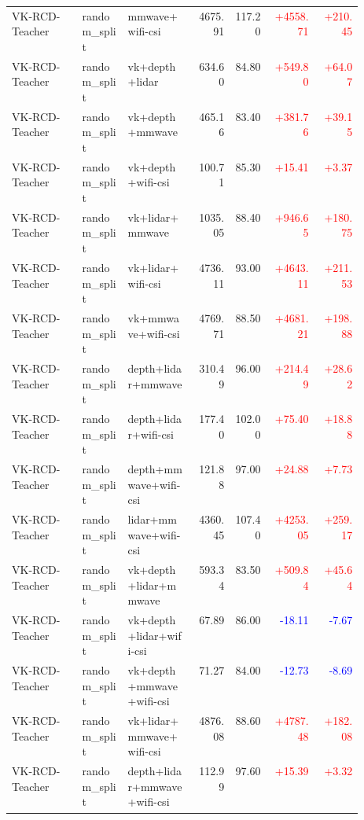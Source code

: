 \begin{longtable}{p{0.20\linewidth}p{0.13\linewidth}p{0.19\linewidth}rrrr}
VK-RCD-Teacher & random\_split & mmwave+wifi-csi & 4675.91 & 117.20 & \textcolor{red}{+4558.71} & \textcolor{red}{+210.45}\\
VK-RCD-Teacher & random\_split & vk+depth+lidar & 634.60 & 84.80 & \textcolor{red}{+549.80} & \textcolor{red}{+64.07}\\
VK-RCD-Teacher & random\_split & vk+depth+mmwave & 465.16 & 83.40 & \textcolor{red}{+381.76} & \textcolor{red}{+39.15}\\
VK-RCD-Teacher & random\_split & vk+depth+wifi-csi & 100.71 & 85.30 & \textcolor{red}{+15.41} & \textcolor{red}{+3.37}\\
VK-RCD-Teacher & random\_split & vk+lidar+mmwave & 1035.05 & 88.40 & \textcolor{red}{+946.65} & \textcolor{red}{+180.75}\\
VK-RCD-Teacher & random\_split & vk+lidar+wifi-csi & 4736.11 & 93.00 & \textcolor{red}{+4643.11} & \textcolor{red}{+211.53}\\
VK-RCD-Teacher & random\_split & vk+mmwave+wifi-csi & 4769.71 & 88.50 & \textcolor{red}{+4681.21} & \textcolor{red}{+198.88}\\
VK-RCD-Teacher & random\_split & depth+lidar+mmwave & 310.49 & 96.00 & \textcolor{red}{+214.49} & \textcolor{red}{+28.62}\\
VK-RCD-Teacher & random\_split & depth+lidar+wifi-csi & 177.40 & 102.00 & \textcolor{red}{+75.40} & \textcolor{red}{+18.88}\\
VK-RCD-Teacher & random\_split & depth+mmwave+wifi-csi & 121.88 & 97.00 & \textcolor{red}{+24.88} & \textcolor{red}{+7.73}\\
VK-RCD-Teacher & random\_split & lidar+mmwave+wifi-csi & 4360.45 & 107.40 & \textcolor{red}{+4253.05} & \textcolor{red}{+259.17}\\
VK-RCD-Teacher & random\_split & vk+depth+lidar+mmwave & 593.34 & 83.50 & \textcolor{red}{+509.84} & \textcolor{red}{+45.64}\\
VK-RCD-Teacher & random\_split & vk+depth+lidar+wifi-csi & 67.89 & 86.00 & \textcolor{blue}{-18.11} & \textcolor{blue}{-7.67}\\
VK-RCD-Teacher & random\_split & vk+depth+mmwave+wifi-csi & 71.27 & 84.00 & \textcolor{blue}{-12.73} & \textcolor{blue}{-8.69}\\
VK-RCD-Teacher & random\_split & vk+lidar+mmwave+wifi-csi & 4876.08 & 88.60 & \textcolor{red}{+4787.48} & \textcolor{red}{+182.08}\\
VK-RCD-Teacher & random\_split & depth+lidar+mmwave+wifi-csi & 112.99 & 97.60 & \textcolor{red}{+15.39} & \textcolor{red}{+3.32}\\

\end{longtable}
